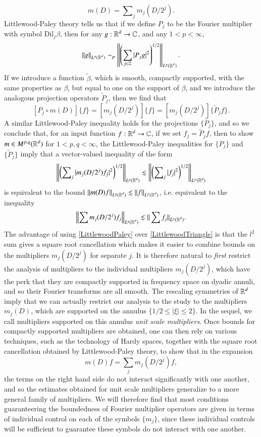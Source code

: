 %
\[ m(D) = \sum\nolimits_j m_j(D / 2^j). \]
%
Littlewood-Paley theory tells us that if we define $P_j$ to be the Fourier multiplier with symbol $\text{Dil}_j \beta$, then for any $g: \operatorname{\mathbb{R}}^d \to \operatorname{\mathbb{C}}$, and any $1 < p < \infty$,
%
\[ \| g \|_{L^p(\operatorname{\mathbb{R}}^d)} \sim_p \left\| \left( \sum_{j \in \operatorname{\mathbb{Z}}} |P_j g|^2 \right)^{1/2} \right\|_{L^p(\operatorname{\mathbb{R}}^d)}. \]
%
If we introduce a function $\tilde{\beta}$, which is smooth, compactly supported, with the same properties as $\beta$, but equal to one on the support of $\beta$, and we introduce the analogous projection operators $\tilde{P}_j$, then we find that
%
\[ [P_j \circ m(D)] \{ f \} = [m_j(D / 2^j)] \{ f \} = [m_j(D/2^j)] \{ \tilde{P}_j f \}. \]
%
A similar Littlewood-Paley inequality holds for the projections $\{ \tilde{P_j} \}$, and so we conclude that, for an input function $f: \operatorname{\mathbb{R}}^d \to \operatorname{\mathbb{C}}$, if we set $f_j = \tilde{P}_j f$, then to show $m \in M^{p,q}(\operatorname{\mathbb{R}}^d)$ for $1 < p,q < \infty$, the Littlewood-Paley inequalities for $\{ P_j \}$ and $\{ \tilde{P}_j \}$ imply that a vector-valued inequality of the form
%
\begin{equation} \label{LittlewoodPaley}
    \left\| \left( \sum\nolimits_j |m_j(D/2^j) f_j|^2 \right)^{1/2} \right\|_{L^q(\operatorname{\mathbb{R}}^d)} \lesssim \left\| \left( \sum\nolimits_j |f_j|^2 \right)^{1/2} \right\|_{L^p(\operatorname{\mathbb{R}}^d)}
\end{equation}
%
is equivalent to the bound $\| m(D) f \|_{L^q(\operatorname{\mathbb{R}}^d)} \lesssim \| f \|_{L^p(\operatorname{\mathbb{R}}^d)}$, i.e. equivalent to the inequality
%
\begin{equation} \label{LittlewoodTriangle}
    \left\| \sum m_j(D/2^j) f_j \right\|_{L^q(\operatorname{\mathbb{R}}^d)} \lesssim \| \sum f_j \|_{L^p(\operatorname{\mathbb{R}}^d)}.
\end{equation}
%
The advantage of using \eqref{LittlewoodPaley} over \eqref{LittlewoodTriangle} is that the $l^2$ sum gives a square root cancellation which makes it easier to combine bounds on the multipliers $m_j(D/2^j)$ for separate $j$. It is therefore natural to \emph{first} restrict the analysis of multipliers to the individual multipliers $m_j(D/2^j)$, which have the perk that they are compactly supported in frequency space on dyadic annuli, and so their Fourier transforms are all smooth. The rescaling symmetries of $\operatorname{\mathbb{R}}^d$ imply that we can actually restrict our analysis to the study to the multipliers $m_j(D)$, which are supported on the annulus $\{ 1/2 \leq |\xi| \leq 2 \}$. In the sequel, we call multipliers supported on this annulus \emph{unit scale multipliers}. Once bounds for compactly supported multipliers are obtained, one can then rely on various techniques, such as the technology of Hardy spaces, together with the square root cancellation obtained by Littlewood-Paley theory, to show that in the expansion
%
\[ m(D) f = \sum_j m_j(D/2^j) f, \]
%
the terms on the right hand side do not interact significantly with one another, and so the estimates obtained for unit scale multipliers generalize to a more general family of multipliers. We will therefore find that most conditions guaranteering the boundedness of Fourier multiplier operators are given in terms of individual control on each of the symbols $\{ m_j \}$, since these individual controls will be sufficient to guarantee these symbols do not interact with one another.

